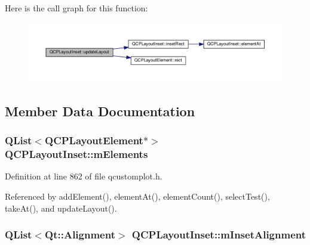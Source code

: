 Here is the call graph for this function\+:\nopagebreak
\begin{figure}[H]
\begin{center}
\leavevmode
\includegraphics[width=350pt]{class_q_c_p_layout_inset_a7b33fdd51b18e6db7cea9bfb2d263b4a_cgraph}
\end{center}
\end{figure}




\subsection{Member Data Documentation}
\hypertarget{class_q_c_p_layout_inset_a8fff7eae9a1be9a5c1e544fb379f682f}{}
\subsubsection[{m\+Elements}]{\setlength{\rightskip}{0pt plus 5cm}Q\+List$<${\bf Q\+C\+P\+Layout\+Element}$\ast$$>$ Q\+C\+P\+Layout\+Inset\+::m\+Elements\hspace{0.3cm}{\ttfamily [protected]}}\label{class_q_c_p_layout_inset_a8fff7eae9a1be9a5c1e544fb379f682f}


Definition at line 862 of file qcustomplot.\+h.



Referenced by add\+Element(), element\+At(), element\+Count(), select\+Test(), take\+At(), and update\+Layout().

\hypertarget{class_q_c_p_layout_inset_a55e9b84c310136ff985a6544184ab64a}{}
\subsubsection[{m\+Inset\+Alignment}]{\setlength{\rightskip}{0pt plus 5cm}Q\+List$<$Qt\+::\+Alignment$>$ Q\+C\+P\+Layout\+Inset\+::m\+Inset\+Alignment\hspace{0.3cm}{\ttfamily [protected]}}\label{class_q_c_p_layout_inset_a55e9b84c310136ff985a6544184ab64a}


